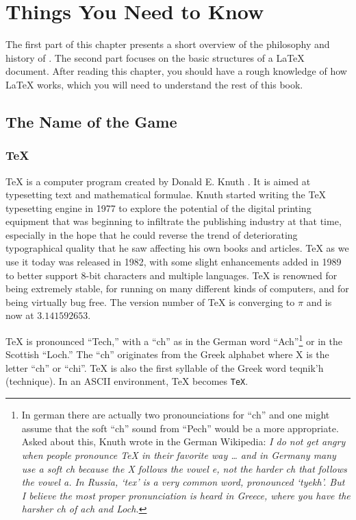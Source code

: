  
\chapter{Things You Need to Know}
\begin{intro}
The first part of this chapter presents a short 
overview of the philosophy and history of \LaTeXe. The second part
focuses on the basic structures of a \LaTeX{} document. 
After reading this chapter, you should have a rough knowledge
of how \LaTeX{} works, which you will need to understand the rest
of this book.  
\end{intro}

\section{The Name of the Game}
\subsection{\TeX}
 
\TeX{} is a computer program created by Donald
E. Knuth \cite{texbook}. It is aimed at typesetting text and
mathematical formulae. Knuth started writing the \TeX{} typesetting
engine in 1977 to explore the potential of the digital printing
equipment that was beginning to infiltrate the publishing industry at
that time, especially in the hope that he could reverse the trend of
deteriorating typographical quality that he saw affecting his own
books and articles. \TeX{} as we use it today was released in 1982,
with some slight enhancements added in 1989 to better support 8-bit
characters and multiple languages. \TeX{} is renowned for being
extremely stable, for running on many different kinds of computers,
and for being virtually bug free. The version number of \TeX{} is
converging to $\pi$ and is now at $3.141592653$.
                                                                       
\TeX{} is pronounced ``Tech,'' with a ``ch'' as in the German word
``Ach''\footnote{In german there are actually two pronounciations for ``ch''
and one might assume that the soft ``ch'' sound from ``Pech'' would be a
more appropriate. Asked about this, Knuth wrote in the German Wikipedia:
\emph{I do not get angry when people pronounce \TeX{} in their favorite way
\ldots{} and in Germany many use a soft ch because the X follows the vowel
e, not the harder ch that follows the vowel a. In Russia, `tex' is a very
common word, pronounced `tyekh'. But I believe the most proper pronunciation
is heard in Greece, where you have the harsher ch of ach and Loch.}}
or in the Scottish ``Loch.'' The ``ch'' originates from the Greek
alphabet where X is the letter ``ch'' or ``chi''. \TeX{} is also the first syllable
of the Greek word {\greektext teqnik'h} (technique). In an ASCII environment, \TeX{}
becomes \texttt{TeX}.

